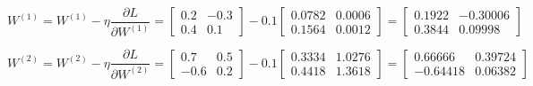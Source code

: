 \documentclass[12pt]{article}
\begin{document}
\begin{enumerate}[font=\Large]
	      $$W^{(1)}=W^{(1)}-\eta\dfrac{\partial L}{\partial W^{(1)}}=\begin{bmatrix}
			      0.2 & -0.3 \\
			      0.4 & 0.1
		      \end{bmatrix}
		      -0.1\begin{bmatrix} 0.0782 & 0.0006\\ 0.1564 & 0.0012 \end{bmatrix}=\begin{bmatrix} 0.1922 & -0.30006\\ 0.3844 & 0.09998 \end{bmatrix}$$

	      $$W^{(2)}=W^{(2)}-\eta\dfrac{\partial L}{\partial W^{(2)}}= \begin{bmatrix}
			      0.7  & 0.5 \\
			      -0.6 & 0.2
		      \end{bmatrix}-0.1\begin{bmatrix} 0.3334 & 1.0276\\ 0.4418 & 1.3618 \end{bmatrix}=\begin{bmatrix} 0.66666 & 0.39724\\ -0.64418 & 0.06382 \end{bmatrix}$$


\end{enumerate}
\end{document}
